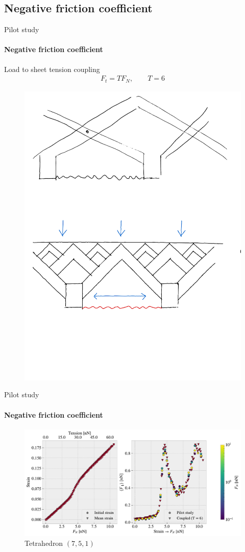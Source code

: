 \documentclass[
	10pt, %
]{beamer}
\begin{document}
\subsection{Negative friction coefficient}
\begin{frame}{Pilot study}
	\framesubtitle{Negative friction coefficient}
	Load to sheet tension coupling 
	\begin{align*}
		F_t = TF_N, \qquad T = 6
	\end{align*}
	\begin{figure}[H]
		\centering
		\includegraphics[width=0.6\linewidth]{../thesis/figures/negative_coefficient/nanomachine.pdf}
	\end{figure}	  
\end{frame}
%
%
\begin{frame}{Pilot study}
	\framesubtitle{Negative friction coefficient}

	\begin{figure}[H]
		\centering
		\includegraphics[width=\linewidth]{../thesis/figures/negative_coefficient/manual_coupling_tension_pop7_5_1.pdf}	
		\caption{Tetrahedron $(7,5,1)$}
	\end{figure}	
\end{frame}
%
%
\end{document}
